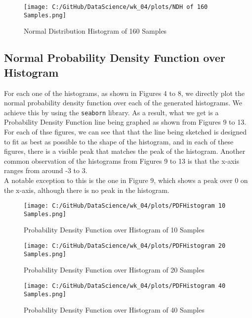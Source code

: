 \documentclass[a4paper,twocolumn]{article}
\begin{document}
\begin{figure}[htbp] 
    \centering
    \noindent
    \texttt{[image: C:/GitHub/DataScience/wk\_04/plots/NDH of 160 Samples.png]}
    \caption{Normal Distribution Histogram of 160 Samples} 
\end{figure}

\subsection{Normal Probability Density Function over Histogram}
For each one of the histograms, as shown in Figures 4 to 8, we directly plot the normal probability density function 
over each of the generated histograms. We achieve this by using the \texttt{seaborn} library. As a result, what we
get is a Probability Density Function line being graphed as shown from Figures 9 to 13. \\

For each of thse figures, we can see that that the line being sketched is designed to fit as best as possible to the
shape of the histogram, and in each of these figures, there is a visible peak that matches the peak of the histogram.
Another common observation of the histograms from Figures 9 to 13 is that the x-axis ranges from around -3 to 3. \\

A notable exception to this is the one in Figure 9, which shows a peak over 0 on the x-axis, although there is no
peak in the histogram.

\begin{figure}[htbp]
    \centering
    \begin{minipage}{0.45\textwidth}
        \centering
        \texttt{[image: C:/GitHub/DataScience/wk\_04/plots/PDFHistogram 10 Samples.png]}
        \caption{Probability Density Function over Histogram of 10 Samples} 
    \end{minipage} \hfill
    \begin{minipage}{0.45\textwidth}
        \centering
        \texttt{[image: C:/GitHub/DataScience/wk\_04/plots/PDFHistogram 20 Samples.png]}
        \caption{Probability Density Function over Histogram of 20 Samples} 
    \end{minipage} 

    \begin{minipage}{0.45\textwidth}
        \centering
        \texttt{[image: C:/GitHub/DataScience/wk\_04/plots/PDFHistogram 40 Samples.png]}
        \caption{Probability Density Function over Histogram of 40 Samples} 
    \end{minipage} 
\end{figure}
\end{document}
